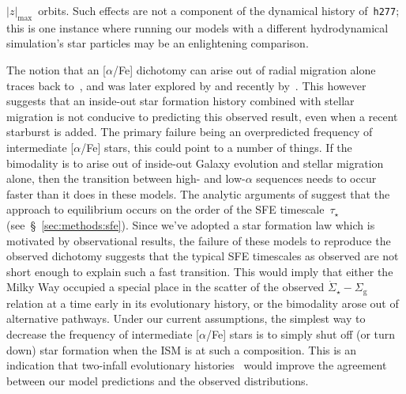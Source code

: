 \documentclass[fleqn, usenatbib]{mnras}
\begin{document}
$\left|z\right|_\text{max}$~orbits. Such effects are not a component of the 
dynamical history of~\texttt{h277}; this is one instance where running our 
models with a different hydrodynamical simulation's star particles may be an 
enlightening comparison. 
\par 
The notion that an [$\alpha$/Fe] dichotomy can arise out of radial migration 
alone traces back to~\citet{Schoenrich2009}, and was later explored by 
\citet{Nidever2014} and recently by~\citet{Sharma2020}. This however suggests 
that an inside-out star formation history combined with stellar migration is not 
conducive to predicting this observed result, even when a recent starburst is 
added. The primary failure being an overpredicted frequency of intermediate 
[$\alpha$/Fe] stars, this could point to a number of things. If the bimodality 
is to arise out of inside-out Galaxy evolution and stellar migration alone, 
then the transition between high- and low-$\alpha$ sequences needs to occur 
faster than it does in these models. The analytic arguments of 
\citet{Weinberg2017} suggest that the approach to equilibrium occurs on the 
order of the SFE timescale~$\tau_\star$ (see~\S~\ref{sec:methods:sfe}). 
Since we've adopted a star formation law which is motivated by observational 
results, the failure of these models to reproduce the observed dichotomy 
suggests that the typical SFE timescales as observed are not short enough to 
explain such a fast transition. This would imply that either the Milky Way 
occupied a special place in the scatter of the observed 
$\dot{\Sigma}_\star-\Sigma_\text{g}$ relation at a time early in its 
evolutionary history, or the bimodality arose out of alternative pathways. 
Under our current assumptions, the simplest way to decrease the frequency of 
intermediate [$\alpha$/Fe] stars is to simply shut off (or turn down) star 
formation when the ISM is at such a composition. This is an indication 
that two-infall evolutionary histories~\citep[e.g.][]{Chiappini1997, 
Chiappini2001, Romano2010, Grisoni2017, Noguchi2018, Palla2020, Spitoni2016, 
Spitoni2018, Spitoni2019a, Spitoni2020, Spitoni2021} would improve the 
agreement between our model predictions and the observed distributions. 
\end{document}
